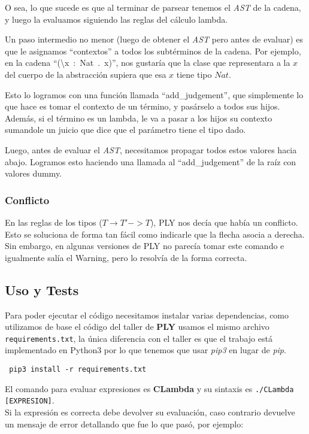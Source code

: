 \documentclass[spanish, a4paper]{article}
\begin{document}
O sea, lo que sucede es que al terminar de parsear tenemos el \textit{AST} de la cadena, y luego la evaluamos siguiendo las reglas del cálculo lambda.

Un paso intermedio no menor (luego de obtener el \textit{AST} pero antes de evaluar) es que le asignamos ``contextos'' a todos los subtérminos de la cadena. Por ejemplo, en la cadena ``(\textbackslash x\ :\ Nat\ .\ x)'', nos gustaría que la clase que representara a la $x$ del cuerpo de la abstracción supiera que esa $x$ tiene tipo $Nat$.

Esto lo logramos con una función llamada ``add\_judgement'', que simplemente lo que hace es tomar el contexto de un término, y pasárselo a todos sus hijos. Además, si el término es un lambda, le va a pasar a los hijos su contexto sumandole un juicio que dice que el parámetro tiene el tipo dado.

Luego, antes de evaluar el \textit{AST}, necesitamos propagar todos estos valores hacia abajo. Logramos esto haciendo una llamada al ``add\_judgement'' de la raíz con valores dummy.

\subsubsection{Conflicto}

En las reglas de los tipos ($T \rightarrow T' -> T$), PLY nos decía que había un conflicto. Esto se soluciona de forma tan fácil como indicarle que la flecha asocia a derecha. Sin embargo, en algunas versiones de PLY no parecía tomar este comando e igualmente salía el Warning, pero lo resolvía de la forma correcta.

\subsection{Uso y Tests}
Para poder ejecutar el código necesitamos instalar varias dependencias, como utilizamos de base el código del taller de \textbf{PLY} usamos el mismo archivo \verb|requirements.txt|, la única diferencia con el taller es que el trabajo está implementado en Python3 por lo que tenemos que usar \textit{pip3} en lugar de \textit{pip}.

\verb| pip3 install -r requirements.txt |

El comando para evaluar expresiones es \textbf{CLambda} y su sintaxis es \verb|./CLambda [EXPRESION]|.\\
Si la expresión es correcta debe devolver su evaluación, caso contrario devuelve un mensaje de error detallando que fue lo que pasó, por ejemplo:
\end{document}
